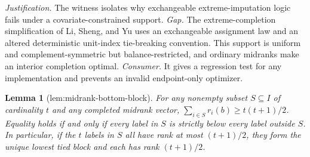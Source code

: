 \documentclass{article}
\newtheorem{lemma}{Lemma}
\begin{document}
\par\smallskip\noindent \textit{Justification.} The witness isolates why exchangeable extreme-imputation logic fails under a covariate-constrained support. \textit{Gap.} The extreme-completion simplification of Li, Sheng, and Yu uses an exchangeable assignment law and an altered deterministic unit-index tie-breaking convention. This support is uniform and complement-symmetric but balance-restricted, and ordinary midranks make an interior completion optimal. \textit{Consumer.} It gives a regression test for any implementation and prevents an invalid endpoint-only optimizer.

\begin{lemma}[lem:midrank-bottom-block]\label{lem:midrank-bottom-block}
For any nonempty subset \(S\subseteq I\) of cardinality \(t\) and any completed midrank vector, \(\sum_{i\in S}r_i(b)\ge t(t+1)/2\). Equality holds if and only if every label in \(S\) is strictly below every label outside \(S\). In particular, if the \(t\) labels in \(S\) all have rank at most \((t+1)/2\), they form the unique lowest tied block and each has rank \((t+1)/2\).
\end{lemma}
\end{document}
